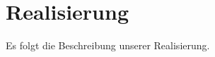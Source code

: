 \chapter{Realisierung}
\begin{Spacing}{\mylinespace}

Es folgt die Beschreibung unserer Realisierung.\\


\clearpage

\clearpage

\clearpage

\clearpage

\end{Spacing}
\newpage
\clearpage
